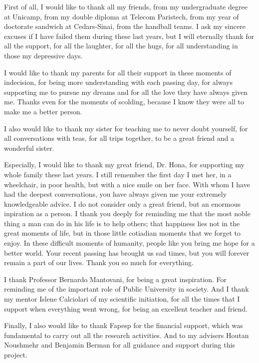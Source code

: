 

First of all, I would like to thank all my friends, from my undergraduate degree at Unicamp, from my double diploma at Telecom Paristech, from my year of doctorate sandwich at Cedars-Sinai, from the handball teams. I ask my sincere excuses if I have failed them during these last years, but I will eternally thank for all the support, for all the laughter, for all the hugs, for all understanding in those my depressive days.

I would like to thank my parents for all their support in these moments of indecision, for being more understanding with each passing day, for always supporting me to pursue my dreams and for all the love they have always given me. Thanks even for the moments of scolding, because I know they were all to make me a better person.

I also would like to thank my sister for teaching me to never doubt yourself, for all conversations with teas, for all trips together, to be a great friend and a wonderful sister.

Especially, I would like to thank my great friend, Dr. Hona, for supporting my whole family these last years.
I still remember the first day I met her, in a wheelchair, in poor health, but with a nice smile on her face. With whom I have had the deepest conversations, you have always given me your extremely knowledgeable advice. I do not consider only a great friend, but an enormous inpiration as a person. I thank you deeply for reminding me that the most noble thing a man can do in his life is to help others; that happiness lies not in the great moments of life, but in those little cotiadian moments that we forget to enjoy. In these difficult moments of humanity, people like you bring me hope for a better world. Your recent passing has brought us sad times, but you will forever remain a part of our lives. Thank you so much for everything.

 I thank Professor Bernardo Mantovani, for being a great inspiration. For reminding me of the important role of Public University in society. And I thank my mentor Islene Calciolari of my scientific initiation, for all the times that I support when everything went wrong, for being an excellent teacher and friend.

Finally, I also would like to thank Fapesp for the financial support, which was fundamental to carry out all the research activities. And to my advisers Houtan Noushmehr and Benjamin Berman for all guidance and support during this project.\\
